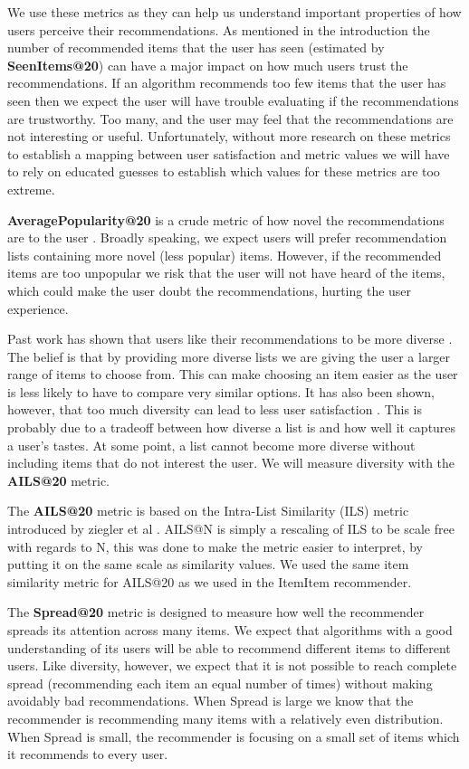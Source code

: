 \documentclass[letterpaper]{sig-alternate}
\begin{document}
  We use these metrics as they can help us understand important properties of how users perceive their recommendations.
  As mentioned in the introduction the number of recommended items that the user has seen (estimated by {\bf SeenItems@20}) can have a major impact on how much users trust the recommendations.
  If an algorithm recommends too few items that the user has seen then we expect the user will have trouble evaluating if the recommendations are trustworthy.
  Too many, and the user may feel that the recommendations are not interesting or useful.
  Unfortunately, without more research on these metrics to establish a mapping between user satisfaction and metric values we will have to rely on educated guesses to establish which values for these metrics are too extreme.

  {\bf AveragePopularity@20} is a crude metric of how novel the recommendations are to the user \cite{zieglerDiversity}.
  Broadly speaking, we expect users will prefer recommendation lists containing more novel (less popular) items.
  However, if the recommended items are too unpopular we risk that the user will not have heard of the items, which could make the user doubt the recommendations, hurting the user experience.

  Past work has shown that users like their recommendations to be more diverse \cite{zieglerDiversity, martijnDiversity}.
  The belief is that by providing more diverse lists we are giving the user a larger range of items to choose from.
  This can make choosing an item easier as the user is less likely to have to compare very similar options.
  It has also been shown, however, that too much diversity can lead to less user satisfaction \cite{zieglerDiversity}.
  This is probably due to a tradeoff between how diverse a list is and how well it captures a user's tastes.
  At some point, a list cannot become more diverse without including items that do not interest the user.
  We will measure diversity with the {\bf AILS@20} metric.

  The {\bf AILS@20} metric is based on the Intra-List Similarity (ILS) metric introduced by ziegler et al \cite{zieglerDiversity}.
  AILS@N is simply a rescaling of ILS to be scale free with regards to N, this was done to make the metric easier to interpret, by putting it on the same scale as similarity values.
  We used the same item similarity metric for AILS@20 as we used in the ItemItem recommender.

  The {\bf Spread@20} metric is designed to measure how well the recommender spreads its attention across many items.
  We expect that algorithms with a good understanding of its users will be able to recommend different items to different users.
  Like diversity, however, we expect that it is not possible to reach complete spread (recommending each item an equal number of times) without making avoidably bad recommendations.
  When Spread is large we know that the recommender is recommending many items with a relatively even distribution.
  When Spread is small, the recommender is focusing on a small set of items which it recommends to every user.
\end{document}

